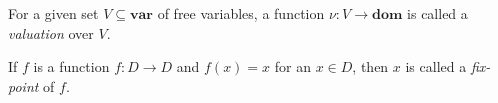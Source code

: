 \begin{defn}
For a given set $V \subseteq \textbf{var}$ of free variables, a function $\nu: V \to \textbf{dom}$ is called a \emph{valuation} over $V$.
\end{defn}

\begin{defn}
If $f$ is a function $f: D \to D$ and $f(x) = x$ for an $x \in D$, then $x$ is called a \emph{fix-point} of $f$.
\end{defn}


\begin{defn}

\end{defn}
